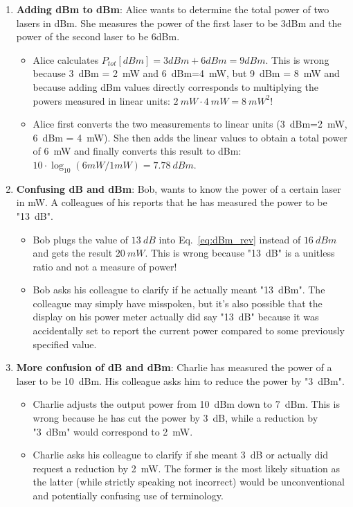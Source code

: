 \begin{enumerate}
    \item \textbf{Adding dBm to dBm}: Alice wants to determine the total power of two lasers in dBm. She measures the power of the first laser to be 3dBm and the power of the second laser to be 6dBm.  
    \begin{itemize}
    \item[\redcross] Alice calculates $P_{tot} [dBm] = 3dBm + 6dBm = 9dBm$. This is wrong because 3~dBm = 2~mW and 6~dBm=4~mW, but 9~dBm = 8~mW and because adding dBm values directly corresponds to multiplying the powers measured in linear units: $2~mW\cdot4~mW = 8~mW^2$!
    \item[\greencheck] Alice first converts the two measurements to linear units (3~dBm=2~mW, 6~dBm = 4~mW). She then adds the linear values to obtain a total power of 6~mW and finally converts this result to dBm: $10\cdot\log_{10}(6mW/1mW)=7.78~dBm$.
    \end{itemize}

    \item \textbf{Confusing dB and dBm}: Bob, wants to know the power of a certain laser in mW. A colleagues of his reports that he has measured the power to be "13~dB".   
    \begin{itemize}
    \item[\redcross] Bob plugs the value of $13~dB$ into Eq.~\ref{eq:dBm_rev} instead of $16~dBm$ and gets the result $20~mW$. This is wrong because "13~dB" is a unitless ratio and not a measure of power!   
    \item[\greencheck] Bob asks his colleague to clarify if he actually meant "13~dBm". The colleague may simply have misspoken, but it's also possible that the display on his power meter actually did say "13~dB" because it was accidentally set to report the current power compared to some previously specified value.
    \end{itemize}

   \item \textbf{More confusion of dB and dBm}: Charlie has measured the power of a laser to be 10~dBm. His colleague asks him to reduce the power by "3~dBm".    
    \begin{itemize}
    \item[\redcross] Charlie adjusts the output power from 10~dBm down to 7~dBm. This is wrong because he has cut the power by 3~dB, while a reduction by "3~dBm" would correspond to 2~mW.  
    \item[\greencheck] Charlie asks his colleague to clarify if she meant 3~dB or actually did request a reduction by 2~mW. The former is the most likely situation as the latter (while strictly speaking not incorrect) would be unconventional and potentially confusing use of terminology.  
    \end{itemize}
    

\end{enumerate}
